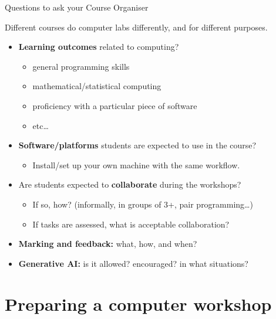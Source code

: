 \documentclass[10pt]{beamer}
\begin{document}
\begin{frame}[fragile]{Questions to ask your Course Organiser}

    Different courses do computer labs differently, and for different purposes.
    \pause

    \begin{itemize}[<+->]
        \item \textbf{Learning outcomes} related to computing?
            \begin{itemize}
                \item general programming skills
                \item mathematical/statistical computing
                \item proficiency with a particular piece of software
                \item etc\ldots
            \end{itemize}
        \item \textbf{Software/platforms} students are expected to use in the course?
            \begin{itemize}
                \item Install/set up your own machine with the same workflow.
            \end{itemize}
        \item Are students expected to \textbf{collaborate} during the workshops?
            \begin{itemize}
                \item If so, how? (informally, in groups of 3+, pair programming\ldots)
                \item If tasks are assessed, what is acceptable collaboration?
            \end{itemize}
        \item \textbf{Marking and feedback:} what, how, and when?
        \item \textbf{Generative AI:} is it allowed? encouraged? in what situations?
    \end{itemize}

  
\end{frame}

\section{Preparing a computer workshop}
\end{document}

